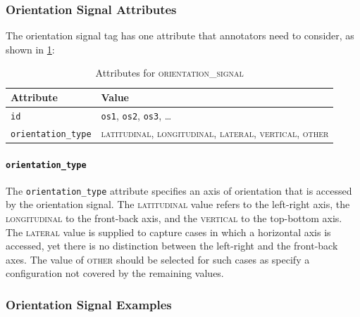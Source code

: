 \documentclass[11pt]{article}
\newenvironment{attributes}
{
\begin{tabular}{|l|l|}
    \hline \textbf{Attribute} & \textbf{Value}\\
}
{   \hline
\end{tabular}
}
\begin{document}

\subsubsection{Orientation Signal Attributes} %
\label{ssub:orientation_signal_attributes}

The orientation signal tag has one attribute that annotators need to consider, as shown in \cref{tab:orientation_signal}:

\begin{table}[h]
\centering
\begin{attributes}
    \hline \texttt{id}                  & \texttt{os1}, \texttt{os2}, 
                                          \texttt{os3}, \ldots\\
    \hline \texttt{orientation\_type}   & \textsc{latitudinal}, 
                                          \textsc{longitudinal}, 
                                          \textsc{lateral}, \textsc{vertical}, 
                                          \textsc{other}\\
\end{attributes}
\caption{Attributes for \textsc{orientation\_signal}}
\label{tab:orientation_signal}
\end{table}

\paragraph{\texttt{orientation\_type}} %
\label{par:orientation_type}
The \texttt{orientation\_type} attribute specifies an axis of orientation that is accessed by the orientation signal. The \textsc{latitudinal} value refers to the left-right axis, the \textsc{longitudinal} to the front-back axis, and the \textsc{vertical} to the top-bottom axis. The \textsc{lateral} value is supplied to capture cases in which a horizontal axis is accessed, yet there is no distinction between the left-right and the front-back axes. The value of \textsc{other} should be selected for such cases as specify a configuration not covered by the remaining values.



\subsubsection{Orientation Signal Examples} %
\label{ssub:orientation_signal_examples}
\end{document}
